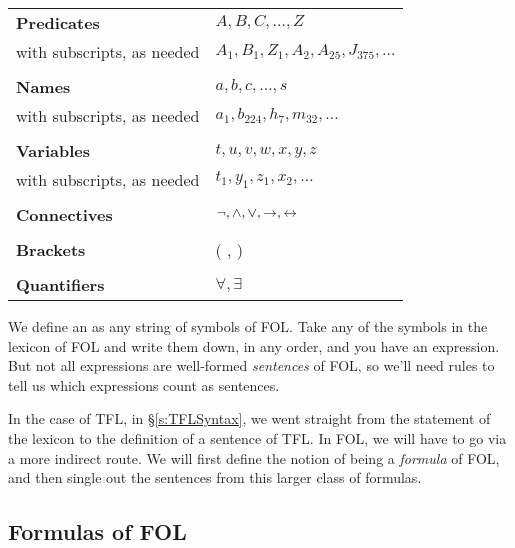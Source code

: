 \begin{center}
\begin{tabular}{l l}
\textbf{Predicates} & $A,B,C,\ldots,Z$\\
with subscripts, as needed & $A_1, B_1,Z_1,A_2,A_{25},J_{375},\ldots$\\
\\
\textbf{Names} & $a,b,c,\ldots, s$\\
with subscripts, as needed & $a_1, b_{224}, h_7, m_{32},\ldots$\\
\\
\textbf{Variables} & $t, u, v, w, x,y,z$\\
with subscripts, as needed & $t_1, y_1, z_1, x_2,\ldots$\\
\\
\textbf{Connectives} & $\neg,\wedge,\vee,\rightarrow,\leftrightarrow$\\
\\
\textbf{Brackets} &( , )\\
\\
\textbf{Quantifiers} & $\forall, \exists$\\
\end{tabular}
\end{center}
We define an  as any string of symbols of FOL. Take any of the symbols in the lexicon of FOL and write them down, in any order, and you have an expression.  But not all expressions are well-formed \emph{sentences} of FOL, so we'll need rules to tell us which expressions count as sentences.


In the case of TFL, in \S\ref{s:TFLSyntax}, we went straight from the statement of the lexicon to the definition of a sentence of TFL. In FOL, we will have to go via a more indirect route.  We will first define the notion of being a  \emph{formula} of FOL, and then single out the sentences from this larger class of formulas.

\subsection{Formulas of FOL}

